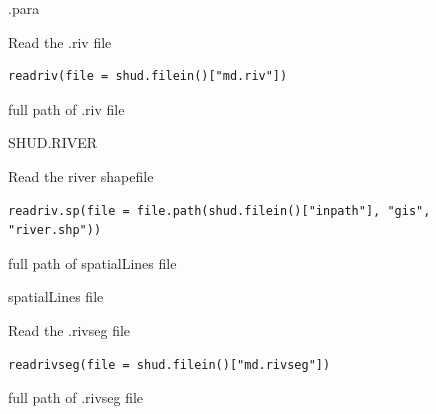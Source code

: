 \documentclass[a4paper]{book}
\begin{document}
%
\begin{Value}
.para
\end{Value}
%
\begin{Description}\relax
Read the .riv file
\end{Description}
%
\begin{Usage}
\begin{verbatim}
readriv(file = shud.filein()["md.riv"])
\end{verbatim}
\end{Usage}
%
\begin{Arguments}
\begin{ldescription}
\item[\code{file}] full path of .riv file
\end{ldescription}
\end{Arguments}
%
\begin{Value}
SHUD.RIVER
\end{Value}
%
\begin{Description}\relax
Read the river shapefile
\end{Description}
%
\begin{Usage}
\begin{verbatim}
readriv.sp(file = file.path(shud.filein()["inpath"], "gis", "river.shp"))
\end{verbatim}
\end{Usage}
%
\begin{Arguments}
\begin{ldescription}
\item[\code{file}] full path of spatialLines file
\end{ldescription}
\end{Arguments}
%
\begin{Value}
spatialLines file
\end{Value}
%
\begin{Description}\relax
Read the .rivseg file
\end{Description}
%
\begin{Usage}
\begin{verbatim}
readrivseg(file = shud.filein()["md.rivseg"])
\end{verbatim}
\end{Usage}
%
\begin{Arguments}
\begin{ldescription}
\item[\code{file}] full path of .rivseg file
\end{ldescription}
\end{Arguments}
\end{document}
